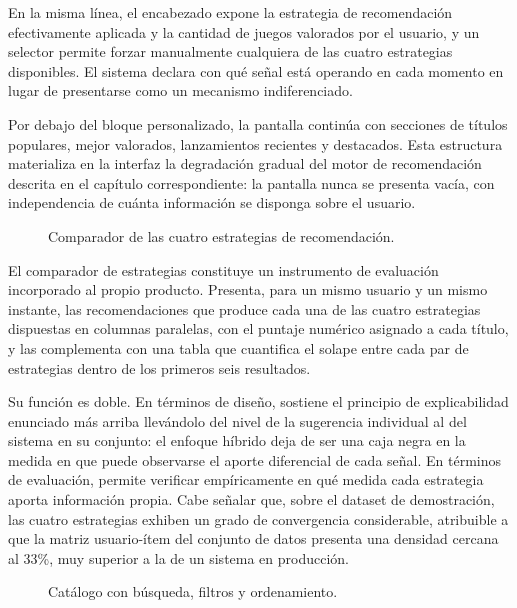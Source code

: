 En la misma línea, el encabezado expone la estrategia de recomendación efectivamente aplicada y la cantidad de juegos valorados por el usuario, y un selector permite forzar manualmente cualquiera de las cuatro estrategias disponibles. El sistema declara con qué señal está operando en cada momento en lugar de presentarse como un mecanismo indiferenciado.

Por debajo del bloque personalizado, la pantalla continúa con secciones de títulos populares, mejor valorados, lanzamientos recientes y destacados. Esta estructura materializa en la interfaz la degradación gradual del motor de recomendación descrita en el capítulo correspondiente: la pantalla nunca se presenta vacía, con independencia de cuánta información se disponga sobre el usuario.

\begin{figure}[ht]
	\centering
	\caption{Comparador de las cuatro estrategias de recomendación.}
	\label{fig:ui-comparador}
\end{figure}

El comparador de estrategias constituye un instrumento de evaluación incorporado al propio producto. Presenta, para un mismo usuario y un mismo instante, las recomendaciones que produce cada una de las cuatro estrategias dispuestas en columnas paralelas, con el puntaje numérico asignado a cada título, y las complementa con una tabla que cuantifica el solape entre cada par de estrategias dentro de los primeros seis resultados.

Su función es doble. En términos de diseño, sostiene el principio de explicabilidad enunciado más arriba llevándolo del nivel de la sugerencia individual al del sistema en su conjunto: el enfoque híbrido deja de ser una caja negra en la medida en que puede observarse el aporte diferencial de cada señal. En términos de evaluación, permite verificar empíricamente en qué medida cada estrategia aporta información propia. Cabe señalar que, sobre el dataset de demostración, las cuatro estrategias exhiben un grado de convergencia considerable, atribuible a que la matriz usuario-ítem del conjunto de datos presenta una densidad cercana al 33\%, muy superior a la de un sistema en producción.

\begin{figure}[ht]
	\centering
	\caption{Catálogo con búsqueda, filtros y ordenamiento.}
	\label{fig:ui-catalogo}
\end{figure}

